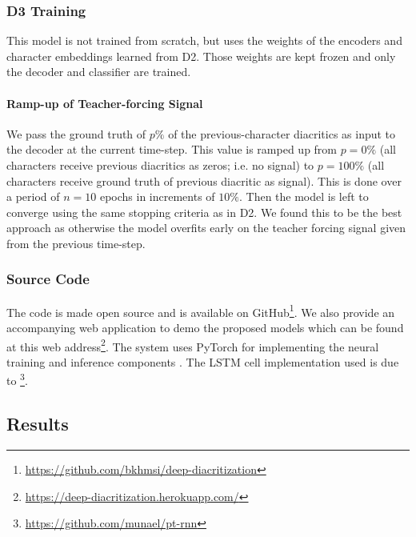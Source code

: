 \documentclass[11pt]{article}
\begin{document}
\subsubsection{D3 Training}
\label{d3-training}
This model is not trained from scratch, but uses the weights of the encoders and character embeddings learned from D2. Those weights are kept frozen and only the decoder and classifier are trained.

\paragraph{Ramp-up of Teacher-forcing Signal}
\label{exp:gt-rampup}
We pass the ground truth of $p\%$ of the previous-character diacritics as input to the decoder at the current time-step. This value is ramped up from $p=0\%$ (all characters receive previous diacritics as zeros; i.e. no signal) to $p=100\%$ (all characters receive ground truth of previous diacritic as signal). This is done over a period of $n=10$ epochs in increments of $10\%$. Then the model is left to converge using the same stopping criteria as in D2. We found this to be the best approach as otherwise the model overfits early on the teacher forcing signal given from the previous time-step. 

\subsubsection{Source Code}
The code is made open source and is available on GitHub\footnote{\url{https://github.com/bkhmsi/deep-diacritization}}. We also provide an accompanying web application to demo the proposed models which can be found at this web address\footnote{\url{https://deep-diacritization.herokuapp.com/}}.
The system uses PyTorch for implementing the neural training and inference components \cite{pytorch19}.
The LSTM cell implementation used is due to \cite{pt-rnn}\footnote{\url{https://github.com/munael/pt-rnn}}.

\subsection{Results}
\end{document}
